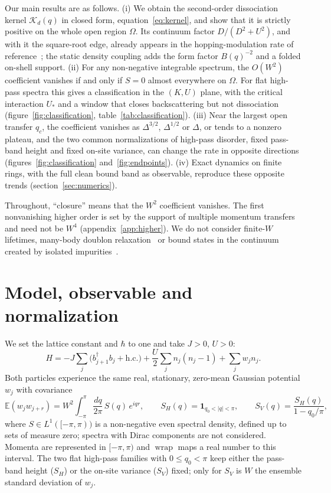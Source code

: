 \documentclass[12pt,a4paper]{article}
\theoremstyle{remark}
\newcommand{\Kd}{\mathcal{K}_d}
\newcommand{\wrap}{\operatorname{wrap}}
\newcommand{\E}{\mathbb{E}}
\newcommand{\Ustar}{U_{*}}
\begin{document}
Our main results are as follows. (i) We obtain the second-order dissociation kernel $\Kd(q)$ in closed form, equation~\eqref{eq:kernel}, and show that it is strictly positive on the whole open region $\Omega$. Its continuum factor $D/(D^2+U^2)$, and with it the square-root edge, already appears in the hopping-modulation rate of reference~\cite{Javanainen2010}; the static density coupling adds the form factor $B(q)^{-2}$ and a folded on-shell support. (ii) For any non-negative integrable spectrum, the $O(W^2)$ coefficient vanishes if and only if $S=0$ almost everywhere on $\Omega$. For flat high-pass spectra this gives a classification in the $(K,U)$ plane, with the critical interaction $\Ustar$ and a window that closes backscattering but not dissociation (figure~\ref{fig:classification}, table~\ref{tab:classification}). (iii) Near the largest open transfer $q_c$, the coefficient vanishes as $\Delta^{3/2}$, $\Delta^{1/2}$ or $\Delta$, or tends to a nonzero plateau, and the two common normalizations of high-pass disorder, fixed pass-band height and fixed on-site variance, can change the rate in opposite directions (figures~\ref{fig:classification} and~\ref{fig:endpoints}). (iv) Exact dynamics on finite rings, with the full clean bound band as observable, reproduce these opposite trends (section~\ref{sec:numerics}).

Throughout, ``closure'' means that the $W^2$ coefficient vanishes. The first nonvanishing higher order is set by the support of multiple momentum transfers and need not be $W^4$ (appendix~\ref{app:higher}). We do not consider finite-$W$ lifetimes, many-body doublon relaxation~\cite{Chudnovskiy2012} or bound states in the continuum created by isolated impurities~\cite{ZhangBraakKollar2012}.

\section{Model, observable and normalization}\label{sec:model}

We set the lattice constant and $\hbar$ to one and take $J>0$, $U>0$:
\begin{equation}\label{eq:H}
H=-J\sum_j\bigl(b_{j+1}^\dagger b_j+\mathrm{h.c.}\bigr)+\frac{U}{2}\sum_j n_j(n_j-1)+\sum_j w_j n_j .
\end{equation}
Both particles experience the same real, stationary, zero-mean Gaussian potential $w_j$ with covariance
\begin{equation}\label{eq:spectrum}
\E(w_jw_{j+r})=W^2\int_{-\pi}^{\pi}\frac{dq}{2\pi}\,S(q)\,e^{iqr},\qquad
S_H(q)=\mathbf{1}_{q_0<|q|<\pi},\qquad S_V(q)=\frac{S_H(q)}{1-q_0/\pi},
\end{equation}
where $S\in L^1([-\pi,\pi))$ is a non-negative even spectral density, defined up to sets of measure zero; spectra with Dirac components are not considered. Momenta are represented in $[-\pi,\pi)$ and $\wrap$ maps a real number to this interval. The two flat high-pass families with $0\le q_0<\pi$ keep either the pass-band height ($S_H$) or the on-site variance ($S_V$) fixed; only for $S_V$ is $W$ the ensemble standard deviation of $w_j$.
\end{document}
